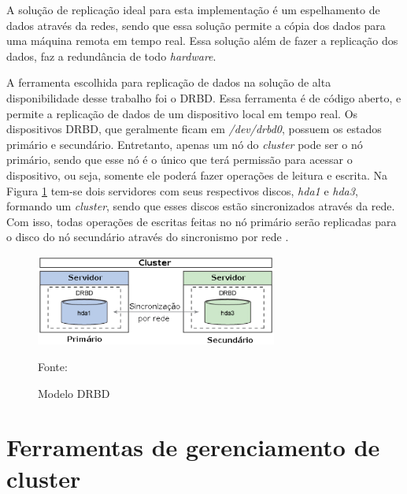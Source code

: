 A solução de replicação ideal para esta implementação é um espelhamento de dados através da redes, sendo que essa solução permite a cópia dos 
dados para uma máquina remota em tempo real. Essa solução além de fazer a replicação dos dados, faz a redundância de todo \textit{hardware}.

A ferramenta escolhida para replicação de dados na solução de alta disponibilidade desse trabalho foi o \ac{DRBD}. Essa ferramenta é de código
aberto, e permite a replicação de dados de um dispositivo local em tempo real. Os dispositivos \ac{DRBD}, que geralmente ficam em 
\textit{/dev/drbd0}, possuem os estados primário e secundário. Entretanto, apenas um nó do \textit{cluster} pode ser o nó primário, sendo que
esse nó é o único que terá permissão para acessar o dispositivo, ou seja, somente ele poderá fazer operações de leitura e escrita.
Na Figura \ref{fig:drbd_basic} tem-se dois servidores com seus respectivos discos, \textit{hda1} e \textit{hda3}, formando um \textit{cluster}, 
sendo que esses discos estão sincronizados através da rede. Com isso, todas operações de escritas feitas no nó primário serão replicadas para 
o disco do nó secundário através do sincronismo por rede \cite{zaminhani2008}.

\begin{figure}[h!]
 \centering
 \includegraphics[width=300px]{img/drbd_basic.eps}
 \caption{Modelo DRBD}
 Fonte: \citet{jones2010}
 \label{fig:drbd_basic}
\end{figure}


\section{Ferramentas de gerenciamento de cluster}
\label{section:toolcluster}

